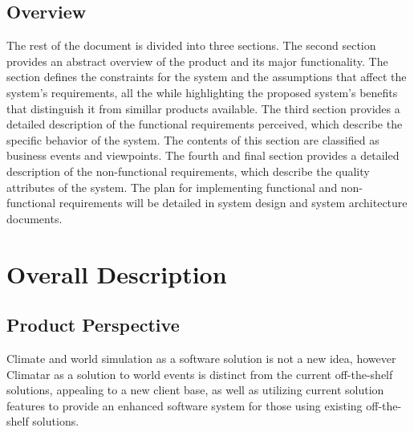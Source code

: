 \documentclass[]{article}
\begin{document}
\subsection{Overview}
\label{sub:overview}
	The rest of the document is divided into three sections. The second section provides an abstract overview of the product and its major functionality. The section defines the constraints for the system and the assumptions that affect the system’s requirements, all the while highlighting the proposed system's benefits that distinguish it from simillar products available. The third section provides a detailed description of the functional requirements perceived, which describe the specific behavior of the system. The contents of this section are classified as business events and viewpoints. The fourth and final section provides a detailed description of the non-functional requirements, which describe the quality attributes of the system. The plan for implementing functional and non-functional requirements will be detailed in system design and system architecture documents. 


\section{Overall Description}
\label{sec:overall_description}
\subsection{Product Perspective}
\label{sub:product_perspective}

Climate and world simulation as a software solution is not a new idea, however Climatar as a solution to world events is distinct from the current off-the-shelf solutions, appealing to a new client base, as well as utilizing current solution features to provide an enhanced software system for those using existing off-the-shelf solutions.
\end{document}
